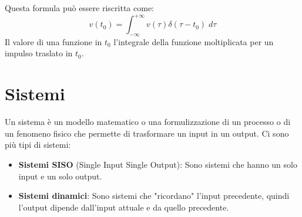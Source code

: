\documentclass[a4paper]{article}
\begin{document}
\begin{itemize}
    \vspace{1em}
    \noindent
    Questa formula può essere riscritta come:
    \[
      v(t_0) = \int_{-\infty}^{+\infty} v(\tau) \delta(\tau-t_0) \; d\tau
    \] 
    Il valore di una funzione in \( t_0 \) l'integrale della funzione moltiplicata
    per un impulso traslato in \( t_0 \).
\end{itemize}

\section{Sistemi}
Un sistema è un modello matematico o una formulizzazione di un processo o di un fenomeno
fisico che permette di trasformare un input in un output. Ci sono più tipi di sistemi:
\begin{itemize}
  \item \textbf{Sistemi SISO} (Single Input Single Output): Sono sistemi che hanno un solo
    input e un solo output.
  \item \textbf{Sistemi dinamici}: Sono sistemi che "ricordano" l'input precedente,
    quindi l'output dipende dall'input attuale e da quello precedente.
\end{itemize}
\end{document}
